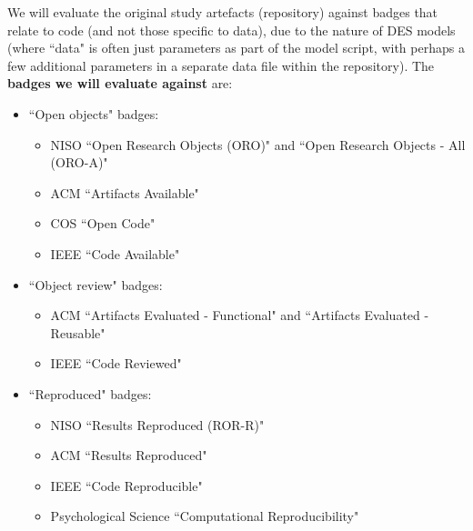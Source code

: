 We will evaluate the original study artefacts (repository) against badges that relate to code (and not those specific to data), due to the nature of DES models (where ``data" is often just parameters as part of the model script, with perhaps a few additional parameters in a separate data file within the repository). The \textbf{badges we will evaluate against} are:
\begin{itemize}
    \item ``Open objects" badges:
    \begin{itemize}
        \item NISO ``Open Research Objects (ORO)" and ``Open Research Objects - All (ORO-A)"\autocite{niso_reproducibility_badging_and_definitions_working_group_reproducibility_2021}
        \item ACM ``Artifacts Available"\autocite{association_for_computing_machinery_acm_artifact_2020}
        \item COS ``Open Code"\autocite{blohowiak_badges_2023}
        \item IEEE ``Code Available"\autocite{institute_of_electrical_and_electronics_engineers_ieee_about_nodate}
    \end{itemize}
    \item ``Object review" badges:
    \begin{itemize}
        \item ACM ``Artifacts Evaluated - Functional" and ``Artifacts Evaluated - Reusable"\autocite{association_for_computing_machinery_acm_artifact_2020}
        \item IEEE ``Code Reviewed"\autocite{institute_of_electrical_and_electronics_engineers_ieee_about_nodate}
    \end{itemize}
    \item ``Reproduced" badges:
    \begin{itemize}
        \item NISO ``Results Reproduced (ROR-R)"\autocite{niso_reproducibility_badging_and_definitions_working_group_reproducibility_2021}
        \item ACM ``Results Reproduced"\autocite{association_for_computing_machinery_acm_artifact_2020}
        \item IEEE ``Code Reproducible"\autocite{institute_of_electrical_and_electronics_engineers_ieee_about_nodate}
        \item Psychological Science ``Computational Reproducibility"\autocite{hardwicke_transparency_2023,association_for_psychological_science_aps_psychological_2023}
    \end{itemize}
\end{itemize}

